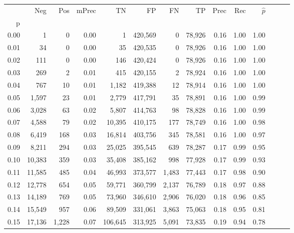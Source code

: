 \begin{tabular}{rrrrrrrrrrrrrr}
\toprule
{} &     Neg &    Pos & mPrec &       TN &       FP &      FN &      TP &  Prec &   Rec & $\hat{p}$ \\
p    &         &        &       &          &          &         &         &       &       &           \\
\midrule
0.00 &       1 &      0 &  0.00 &        1 &  420,569 &       0 &  78,926 &  0.16 &  1.00 &      1.00 \\
0.01 &      34 &      0 &  0.00 &       35 &  420,535 &       0 &  78,926 &  0.16 &  1.00 &      1.00 \\
0.02 &     111 &      0 &  0.00 &      146 &  420,424 &       0 &  78,926 &  0.16 &  1.00 &      1.00 \\
0.03 &     269 &      2 &  0.01 &      415 &  420,155 &       2 &  78,924 &  0.16 &  1.00 &      1.00 \\
0.04 &     767 &     10 &  0.01 &    1,182 &  419,388 &      12 &  78,914 &  0.16 &  1.00 &      1.00 \\
0.05 &   1,597 &     23 &  0.01 &    2,779 &  417,791 &      35 &  78,891 &  0.16 &  1.00 &      0.99 \\
0.06 &   3,028 &     63 &  0.02 &    5,807 &  414,763 &      98 &  78,828 &  0.16 &  1.00 &      0.99 \\
0.07 &   4,588 &     79 &  0.02 &   10,395 &  410,175 &     177 &  78,749 &  0.16 &  1.00 &      0.98 \\
0.08 &   6,419 &    168 &  0.03 &   16,814 &  403,756 &     345 &  78,581 &  0.16 &  1.00 &      0.97 \\
0.09 &   8,211 &    294 &  0.03 &   25,025 &  395,545 &     639 &  78,287 &  0.17 &  0.99 &      0.95 \\
0.10 &  10,383 &    359 &  0.03 &   35,408 &  385,162 &     998 &  77,928 &  0.17 &  0.99 &      0.93 \\
0.11 &  11,585 &    485 &  0.04 &   46,993 &  373,577 &   1,483 &  77,443 &  0.17 &  0.98 &      0.90 \\
0.12 &  12,778 &    654 &  0.05 &   59,771 &  360,799 &   2,137 &  76,789 &  0.18 &  0.97 &      0.88 \\
0.13 &  14,189 &    769 &  0.05 &   73,960 &  346,610 &   2,906 &  76,020 &  0.18 &  0.96 &      0.85 \\
0.14 &  15,549 &    957 &  0.06 &   89,509 &  331,061 &   3,863 &  75,063 &  0.18 &  0.95 &      0.81 \\
0.15 &  17,136 &  1,228 &  0.07 &  106,645 &  313,925 &   5,091 &  73,835 &  0.19 &  0.94 &      0.78 \\

\end{tabular}
